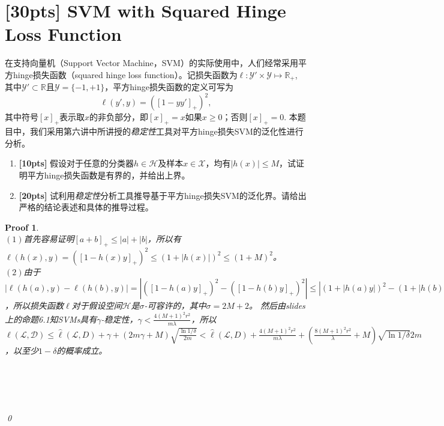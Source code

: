 \documentclass[a4paper,UTF8]{article}
\numberwithin{equation}{section}
\newtheorem*{myProof}{Proof}
\begin{document}
	\section{[30pts] SVM with Squared Hinge Loss Function}
	在支持向量机（Support Vector Machine，SVM）的实际使用中，人们经常采用平方hinge损失函数（squared hinge loss function）。记损失函数为$\ell: \mathcal{Y}'\times \mathcal{Y} \mapsto \mathbb{R}_+$, 其中$\mathcal{Y}' \subset \mathbb{R}$且$\mathcal{Y} = \{-1,+1\}$，平方hinge损失函数的定义可写为
	\begin{equation}
	\label{eq:squared-hinge-loss}
	\ell(y',y) = ([1-yy']_+)^2,
	\end{equation}
	其中符号$[x]_+$表示取$x$的非负部分，即$[x]_+ = x$如果$x\geq 0$；否则$[x]_+ = 0$. 本题目中，我们采用第六讲中所讲授的\emph{稳定性}工具对平方hinge损失SVM的泛化性进行分析。
	
	\begin{enumerate}[ {(}1{)}]
		\item \textbf{[10pts]} 假设对于任意的分类器$h\in \mathcal{H}$及样本$x\in \mathcal{X}$，均有$\lvert h(x) \rvert \leq M$，试证明平方hinge损失函数是有界的，并给出上界。
		\item \textbf{[20pts]} 试利用\emph{稳定性}分析工具推导基于平方hinge损失SVM的泛化界。请给出严格的结论表述和具体的推导过程。
	\end{enumerate}
	
	\begin{myProof}~\\
$(1)$首先容易证明$[a+b]_+ \le |a| + |b|$，所以有$\ell(h(x), y) = ([1 - h(x)y]_+)^2 \le (1 + |h(x)|)^2 \le (1 + M)^2$。
~\\
$(2)$由于$|\ell(h(a), y) - \ell(h(b), y)| = | ([1 - h(a)y]_+)^2 - ([1 - h(b)y]_+)^2 | \le | (1 + |h(a)y|)^2 - (1 + |h(b)y|)^2 | = | (1 + |h(a)|)^2 - (1 + |h(b)|)^2 | = | (h(a) +  h(b) + 2) | |h(a) - h(b)| \le (2M + 2) |h(a) - h(b)|$，所以损失函数$\ell$对于假设空间$\mathcal{H}$是$\sigma$-可容许的，其中$\sigma=2M+2$。
然后由slides上的命题6.1知SVMs具有$\gamma$-稳定性，$\gamma < \frac{4(M+1)^2r^2}{m\lambda}$，所以$\ell(\mathcal{L, D}) \le \hat{\ell}(\mathcal{L}, D) + \gamma + (2m\gamma + M) \sqrt{\frac{\ln 1/\delta}{2m}} < \hat{\ell}(\mathcal{L}, D) + \frac{4(M+1)^2r^2}{m\lambda} + (\frac{8(M+1)^2r^2}{\lambda} + M) \sqrt{\ln 1/\delta}{2m}$，以至少$1 - \delta$的概率成立。
		

	~\\
	~\\
	~\\
	~\\
	\qed
	\end{myProof}
	
\end{document}
